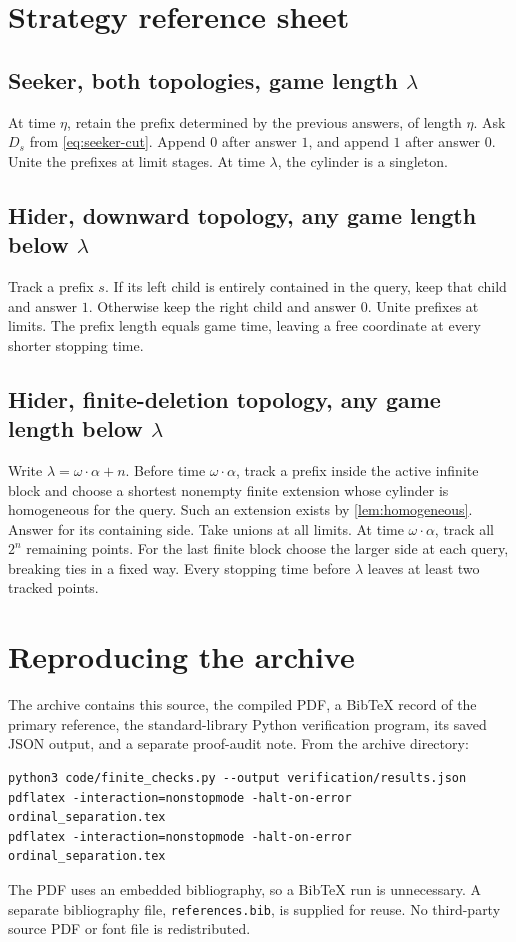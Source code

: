 \documentclass[11pt,a4paper]{article}
\theoremstyle{definition}
\theoremstyle{remark}
\begin{document}
\appendix
\section{Strategy reference sheet}

\subsection*{Seeker, both topologies, game length $\lambda$}
At time $\eta$, retain the prefix determined by the previous answers, of length
$\eta$. Ask $D_s$ from \eqref{eq:seeker-cut}. Append $0$ after answer $1$, and
append $1$ after answer $0$. Unite the prefixes at limit stages. At time
$\lambda$, the cylinder is a singleton.

\subsection*{Hider, downward topology, any game length below $\lambda$}
Track a prefix $s$. If its left child is entirely contained in the query, keep
that child and answer $1$. Otherwise keep the right child and answer $0$.
Unite prefixes at limits. The prefix length equals game time, leaving a free
coordinate at every shorter stopping time.

\subsection*{Hider, finite-deletion topology, any game length below $\lambda$}
Write $\lambda=\omega\cdot\alpha+n$. Before time $\omega\cdot\alpha$, track a
prefix inside the active infinite block and choose a shortest nonempty finite
extension whose cylinder is homogeneous for the query. Such an extension exists
by \cref{lem:homogeneous}. Answer for its containing side. Take unions at all
limits. At time $\omega\cdot\alpha$, track all $2^n$ remaining points. For the
last finite block choose the larger side at each query, breaking ties in a fixed
way. Every stopping time before $\lambda$ leaves at least two tracked points.

\section{Reproducing the archive}
The archive contains this source, the compiled PDF, a Bib\TeX{} record of the
primary reference, the standard-library Python verification program, its saved
JSON output, and a separate proof-audit note. From the archive directory:
\begin{lstlisting}
python3 code/finite_checks.py --output verification/results.json
pdflatex -interaction=nonstopmode -halt-on-error ordinal_separation.tex
pdflatex -interaction=nonstopmode -halt-on-error ordinal_separation.tex
\end{lstlisting}
The PDF uses an embedded bibliography, so a Bib\TeX{} run is unnecessary.
A separate bibliography file, \texttt{references.bib}, is supplied for reuse. No third-party source PDF
or font file is redistributed.
\end{document}
